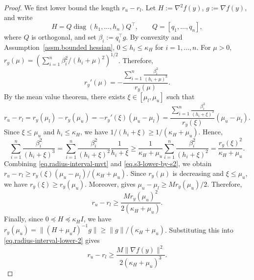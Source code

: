 \documentclass{article}
\begin{document}
\begin{proof}
    We first lower bound the length \(r_u-r_l\). Let \(H:=\nabla^2 f(y)\),
    \(g:=\nabla f(y)\), and write
    \[
        H=Q\operatorname{diag}(h_1,\ldots,h_n)Q^\top,
        \qquad
        Q=[q_1,\ldots,q_n],
    \]
    where $Q$ is orthogonal, and set \(\beta_i:=q_i^\top g\). By convexity and
    Assumption~\ref{assm.bounded hessian}, \(0\le h_i\le \kappa_H\) for
    \(i=1,\ldots,n\). For \(\mu>0\),
    \(r_y(\mu)=\left(\sum_{i=1}^n\beta_i^2/(h_i+\mu)^2\right)^{1/2}\).
    Therefore,
    \begin{equation}
        \label{eq.derivative-ry}
        r_y'(\mu)
        =
        -
        \frac{
            \sum_{i=1}^n
            \frac{\beta_i^2}{(h_i+\mu)^3}
        }{
            r_y(\mu)
        }.
    \end{equation}
    By the mean value theorem, there exists
    \(\xi\in[\mu_l,\mu_u]\) such that
    \begin{equation}
        r_u-r_l
        =
        r_y(\mu_l)-r_y(\mu_u)
        =
        -r_y'(\xi)(\mu_u-\mu_l)
        =
        \frac{
            \sum_{i=1}^n
            \frac{\beta_i^2}{(h_i+\xi)^3}
        }{
            r_y(\xi)
        }
        (\mu_u-\mu_l).
        \label{eq.radius-interval-mvt}
    \end{equation}
    Since \(\xi\le \mu_u\) and \(h_i\le \kappa_H\), we have
    \(1/(h_i+\xi)\ge 1/(\kappa_H+\mu_u)\). Hence,
    \begin{equation}
        \sum_{i=1}^n
        \frac{\beta_i^2}{(h_i+\xi)^3}
        =
        \sum_{i=1}^n
        \frac{\beta_i^2}{(h_i+\xi)^2}
        \frac{1}{h_i+\xi}
        \ge
        \frac{1}{\kappa_H+\mu_u}
        \sum_{i=1}^n
        \frac{\beta_i^2}{(h_i+\xi)^2}
        =
        \frac{r_y(\xi)^2}{\kappa_H+\mu_u}.
        \label{eq.s3-lower-by-s2}
    \end{equation}
    Combining \eqref{eq.radius-interval-mvt} and \eqref{eq.s3-lower-by-s2}, we obtain
    \(r_u-r_l\ge r_y(\xi)(\mu_u-\mu_l)/(\kappa_H+\mu_u)\).
    Since \(r_y(\mu)\) is decreasing and \(\xi\le \mu_u\), we have
    \(r_y(\xi)\ge r_y(\mu_u)\). Moreover,  gives
    \(\mu_u-\mu_l\ge M r_y(\mu_u)/2\). Therefore,
    \begin{equation}
        \label{eq.radius-interval-lower-2}
        r_u-r_l
        \ge
        \frac{M r_y(\mu_u)^2}{2(\kappa_H+\mu_u)}.
    \end{equation}
    Finally, since \(0\preceq H\preceq \kappa_H I\), we have
    \(r_y(\mu_u)=\|(H+\mu_u I)^{-1}g\|\ge \|g\|/(\kappa_H+\mu_u)\).
    Substituting this into \eqref{eq.radius-interval-lower-2} gives
    \begin{equation}
        \label{eq.radius-interval-lower-final}
        r_u-r_l
        \ge
        \frac{M\|\nabla f(y)\|^2}{2(\kappa_H+\mu_u)^3}.
    \end{equation}


\end{proof}
\end{document}
